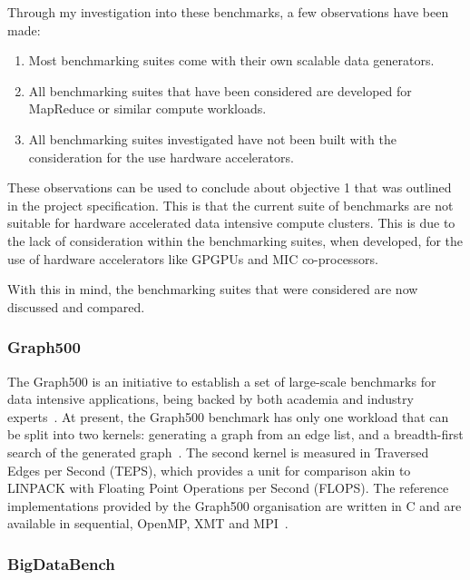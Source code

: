 \documentclass[12pt,a4paper]{article}
\begin{document}
            Through my investigation into these benchmarks, a few observations have been made:
            
            \begin{enumerate}
            \item Most benchmarking suites come with their own scalable data generators.
            \item All benchmarking suites that have been considered are developed for MapReduce or similar compute workloads.
            \item All benchmarking suites investigated have not been built with the consideration for the use hardware accelerators.
            \end{enumerate}
            
            These observations can be used to conclude about objective 1 that was outlined in the project specification. This is that the current suite of benchmarks are not suitable for hardware accelerated data intensive compute clusters. This is due to the lack of consideration within the benchmarking suites, when developed, for the use of hardware accelerators like GPGPUs and MIC co-processors.
            
            With this in mind, the benchmarking suites that were considered are now discussed and compared.
    
            \subsubsection{Graph500}
            \label{ssub:graph500}
            
                The Graph500 is an initiative to establish a set of large-scale benchmarks for data intensive applications, being backed by both academia and industry experts~\cite{graph500-intro}. At present, the Graph500 benchmark has only one workload that can be split into two kernels: generating a graph from an edge list, and a breadth-first search of the generated graph~\cite{graph500-spec}. The second kernel is measured in Traversed Edges per Second (TEPS), which provides a unit for comparison akin to LINPACK with Floating Point Operations per Second (FLOPS). The reference implementations provided by the Graph500 organisation are written in C and are available in sequential, OpenMP, XMT and MPI~\cite{graph500-reference-impl}.
        
            \subsubsection{BigDataBench}
            \label{ssub:bigdatabench}
\end{document}
